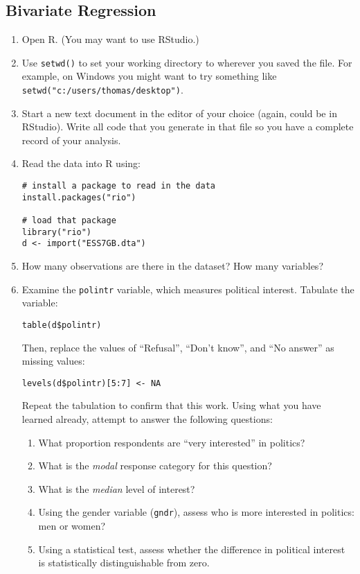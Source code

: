 \documentclass[a4paper,12pt]{article}
\begin{document}
\subsection{Bivariate Regression}

\begin{enumerate}

\item Open R. (You may want to use RStudio.)

\item Use \texttt{setwd()} to set your working directory to wherever you saved the file. For example, on Windows you might want to try something like \texttt{setwd("c:/users/thomas/desktop")}.

\item Start a new text document in the editor of your choice (again, could be in RStudio). Write all code that you generate in that file so you have a complete record of your analysis.

\item Read the data into R using: 

\begin{verbatim}
# install a package to read in the data
install.packages("rio")

# load that package
library("rio")
d <- import("ESS7GB.dta")
\end{verbatim}

\item How many observations are there in the dataset? How many variables?

\item Examine the \texttt{polintr} variable, which measures political interest. Tabulate the variable:

\begin{verbatim}
table(d$polintr)
\end{verbatim}

\noindent Then, replace the values of ``Refusal'', ``Don't know'', and ``No answer'' as missing values: 

\begin{verbatim}
levels(d$polintr)[5:7] <- NA
\end{verbatim}

\noindent Repeat the tabulation to confirm that this work. Using what you have learned already, attempt to answer the following questions:

\begin{enumerate}
\item What proportion respondents are ``very interested'' in politics?	
\item What is the \textit{modal} response category for this question?
\item What is the \textit{median} level of interest?
\item Using the gender variable (\texttt{gndr}), assess who is more interested in politics: men or women?
\item Using a statistical test, assess whether the difference in political interest is statistically distinguishable from zero.
\end{enumerate}


\end{enumerate}
\end{document}
